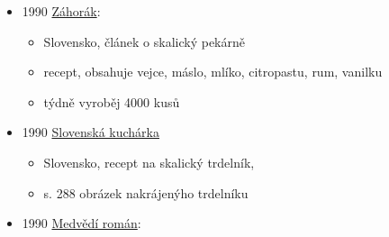 \begin{itemize}
  \begin{itemize}
  \tightlist
  \item
    s. 27: Krčmová, Silva. Představujeme lidové vypravěče. Na návštěvě u
    Jožky Šífara.

    \begin{itemize}
    \tightlist
    \item
      za mlada byl veslař, proto přezdívka Šífar, jinak je to Jožka
      Horčička z Poštorné
    \item
      vypráví historku o dračkách, v zimě se dere peří, u tetky Růženy
      se schází nejlepší dračky a zároveň největší klevetnice
    \item
      aby jí nepomluvily, tak napeče koláče, trdolníky (fakt píše
      trdolníky), čaj, zázvorkové, klobásky
    \end{itemize}
  \item
    s. 29: Vlasáková, Olga. Masopust a ostatkové pečivo.

    \begin{itemize}
    \tightlist
    \item
      v původní podobě nad ohněm se zachoval jen ve Skalici
    \item
      recept na smaženej trdelník z Hustopečska, dělanej na kukuřičných
      kotrlačkách (lodyhy) nebo trubičkovejch formách
    \end{itemize}
  \end{itemize}
\item
  1990
  \href{https://dikda.snk.sk/uuid/uuid:d4c3bafc-0e1e-4cb1-8e37-24b0294ec64b}{Záhorák}:

  \begin{itemize}
  \tightlist
  \item
    Slovensko, článek o skalický pekárně
  \item
    recept, obsahuje vejce, máslo, mlíko, citropastu, rum, vanilku
  \item
    týdně vyroběj 4000 kusů
  \end{itemize}
\item
  1990
  \href{https://dikda.snk.sk/uuid/uuid:51e3241b-d1cc-4430-a318-822c58fc4dae}{Slovenská
  kuchárka}

  \begin{itemize}
  \tightlist
  \item
    Slovensko, recept na skalický trdelník,
  \item
    s. 288 obrázek nakrájenýho trdelníku
  \end{itemize}
\item
  1990
  \href{https://www.digitalniknihovna.cz/mzk/uuid/uuid:7fb8c2c0-0b58-11e4-8f64-005056827e52}{Medvědí
  román}:


\end{itemize}
